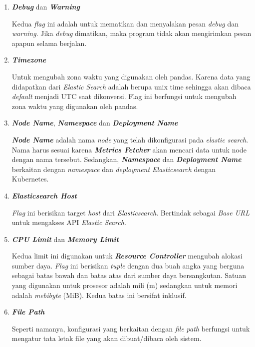 \begin{enumerate}
    \item \textbf{\textit{Debug}} dan \textbf{\textit{Warning}}
    
    Kedua \textit{flag} ini adalah untuk mematikan dan menyalakan pesan \textit{debug} dan \textit{warning}. Jika \textit{debug} dimatikan, maka program tidak akan mengirimkan pesan apapun selama berjalan.

    \item \textbf{\textit{Timezone}}
    
    Untuk mengubah zona waktu yang digunakan oleh pandas. Karena data yang didapatkan dari \textit{Elastic Search} adalah berupa unix time sehingga akan dibaca \textit{default} menjadi UTC saat dikonversi. Flag ini berfungsi untuk mengubah zona waktu yang digunakan oleh pandas.

    \item \textbf{\textit{Node Name}}, \textbf{\textit{Namespace}} dan \textbf{\textit{Deployment Name}}
    
    \textbf{\textit{Node Name}} adalah nama \textit{node} yang telah dikonfigurasi pada \textit{elastic search}. Nama harus sesuai karena \textbf{\textit{Metrics Fetcher}} akan mencari data untuk node dengan nama tersebut. Sedangkan, \textbf{\textit{Namespace}} dan \textbf{\textit{Deployment Name}} berkaitan dengan \textit{namespace} dan \textit{deployment Elasticsearch} dengan Kubernetes.

    \item \textbf{\textit{Elasticsearch Host}}
    
    \textit{Flag} ini berisikan target \textit{host} dari \textit{Elasticsearch}. Bertindak sebagai \textit{Base URL} untuk mengakses API \textit{Elastic Search}.

    \item \textbf{\textit{CPU Limit}} dan \textbf{\textit{Memory Limit}}
    
    Kedua limit ini digunakan untuk \textbf{\textit{Resource Controller}} mengubah alokasi sumber daya. \textit{Flag} ini berisikan \textit{tuple} dengan dua buah angka yang berguna sebagai batas bawah dan batas atas dari sumber daya bersangkutan. Satuan yang digunakan untuk prosesor adalah mili (m) sedangkan untuk memori adalah \textit{mebibyte} (MiB). Kedua batas ini bersifat inklusif.

    \item \textbf{\textit{File Path}}
    
    Seperti namanya, konfigurasi yang berkaitan dengan \textit{file path} berfungsi untuk mengatur tata letak file yang akan dibuat/dibaca oleh sistem.


\end{enumerate}
